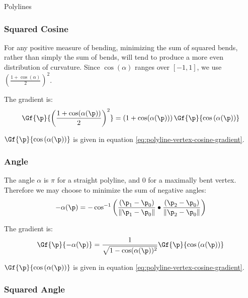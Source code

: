 \begin{plSection}{Polylines}

\subsubsection{Squared Cosine}
\label{sec:polyline-vertex-squared-cosine}

For any positive measure of bending,
minimizing the sum of squared bends,
rather than simply the sum of bends,
will tend to produce a more even distribution of curvature.
Since $\cos(\alpha)$ ranges over $[-1,1]$,
we use $\left( \frac{1 + \cos(\alpha)}{2} \right)^2$.

The gradient is:
\begin{equation}
\Gf{\p}{\left( {{1 + \cos(\alpha(\p))} \over 2} \right)^2}
=
\left( 1 + \cos(\alpha(\p)) \right)
\Gf{\p}{\cos\left(\alpha(\p)\right)}
\end{equation}

$\Gf{\p}{\cos\left(\alpha(\p)\right)}$ is given
in equation \ref{eq:polyline-vertex-cosine-gradient}.


\subsubsection{Angle}
\label{sec:polyline-vertex-angle}


The angle $\alpha$ is $\pi$ for a straight polyline,
and $0$ for a maximally bent vertex.
Therefore we may choose to minimize the sum of negative angles:
\begin{equation}
-\alpha(\p) =
-\cos^{-1} \left(
{{(\p_1 - \p_0)} \over {\| \p_1 - \p_0 \|} }
\bullet
{{(\p_2 - \p_0)} \over {\| \p_2 - \p_0 \|} }
\right)
\end{equation}

The gradient is:
\begin{equation}
\Gf{\p}{-\alpha(\p)}
=
{{1} \over {\sqrt{ 1 - \cos(\alpha(\p))^2}}}
\Gf{\p}{\cos\left(\alpha(\p)\right)}
\end{equation}

$\Gf{\p}{\cos\left(\alpha(\p)\right)}$ is given
in equation \ref{eq:polyline-vertex-cosine-gradient}.


\subsubsection{Squared Angle}
\label{sec:polyline-vertex-squared-angle}


\end{plSection}

